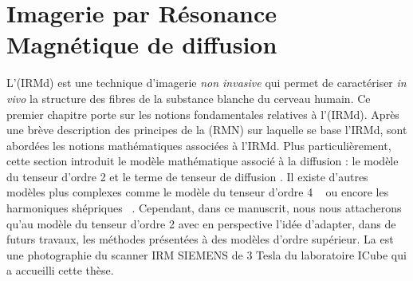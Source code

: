 
\chapter{Imagerie par Résonance Magnétique de diffusion} 
\label{Chapter1}

L'\irmd (IRMd) est une technique d'imagerie \textit{non invasive} 
qui permet de caractériser \textit{in vivo} la structure des fibres de la substance blanche du cerveau humain.
Ce premier chapitre porte sur les notions fondamentales relatives à l'\irmd (IRMd).
Après une brève description des principes de la \rmn (RMN) sur laquelle se base l'IRMd,
sont abordées les notions mathématiques associées à l'IRMd.
Plus particulièrement, cette section introduit le modèle mathématique associé à la diffusion : \og le modèle du tenseur d'ordre 2 \fg
et le terme de \og tenseur de diffusion \fg. 
Il existe d'autres modèles plus complexes comme \og le modèle du tenseur d'ordre 4 \fg~\cite{Basser1994} 
ou encore \og les harmoniques shépriques \fg~\cite{Barmpoutis2009}.
Cependant, dans ce manuscrit, nous nous attacherons qu'au \og modèle du tenseur d'ordre 2 \fg 
avec en perspective l'idée d'adapter, dans de futurs travaux, les méthodes présentées à des modèles d'ordre supérieur.
La  est une photographie du scanner IRM SIEMENS de 3 Tesla du laboratoire ICube qui a accueilli cette thèse.

